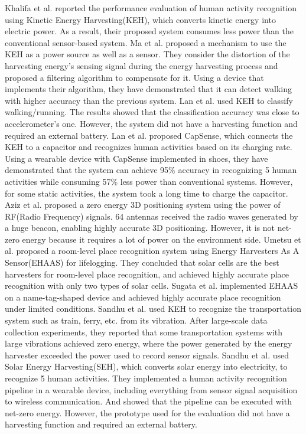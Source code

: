 \documentclass[conference]{IEEEtran}
\begin{document}
Khalifa et al.\cite{khalifa2017harke} reported the performance evaluation of human activity recognition using Kinetic Energy Harvesting(KEH), which converts kinetic energy into electric power.
As a result, their proposed system consumes less power than the conventional sensor-based system.
Ma et al.\cite{ma2018sehs, ma2020simultaneous} proposed a mechanism to use the KEH as a power source as well as a sensor.
They consider the distortion of the harvesting energy's sensing signal during the energy harvesting process and proposed a filtering algorithm to compensate for it.
Using a device that implements their algorithm, they have demonstrated that it can detect walking with higher accuracy than the previous system.
Lan et al.\cite{lan2015estimating} used KEH to classify walking/running. The results showed that the classification accuracy was close to accelerometer's one.
However, the system did not have a harvesting function and required an external battery.
Lan et al. proposed CapSense\cite{lan2017capsense, lan2020capacitor}, which connects the KEH to a capacitor and recognizes human activities based on its charging rate.
Using a wearable device with CapSense implemented in shoes, they have demonstrated that the system can achieve 95\% accuracy in recognizing 5 human activities while consuming 57\% less power than conventional systems.
However, for some static activities, the system took a long time to charge the capacitor.
Aziz et al.\cite{aziz2019battery} proposed a zero energy 3D positioning system using the power of RF(Radio Frequency) signals.
64 antennas received the radio waves generated by a huge beacon, enabling highly accurate 3D positioning.
However, it is not net-zero energy because it requires a lot of power on the environment side.
Umetsu et al.\cite{umetsu2019ehaas} proposed a room-level place recognition system using Energy Harvesters As A Sensor(EHAAS) for lifelogging.
They concluded that solar cells are the best harvesters for room-level place recognition, and achieved highly accurate place recognition with only two types of solar cells.
Sugata et al.\cite{sugata2019battery} implemented EHAAS on a name-tag-shaped device and achieved highly accurate place recognition under limited conditions.
Sandhu et al.\cite{sandhu2020towards} used KEH to recognize the transportation system such as train, ferry, etc. from its vibration.
After large-scale data collection experiments, they reported that some transportation systems with large vibrations achieved zero energy, where the power generated by the energy harvester exceeded the power used to record sensor signals.
Sandhu et al.\cite{Sandhu2021SolAREP} used Solar Energy Harvesting(SEH), which converts solar energy into electricity, to recognize 5 human activities.
They implemented a human activity recognition pipeline in a wearable device, including everything from sensor signal acquisition to wireless communication.
And showed that the pipeline can be executed with net-zero energy.
However, the prototype used for the evaluation did not have a harvesting function and required an external battery.
\end{document}
